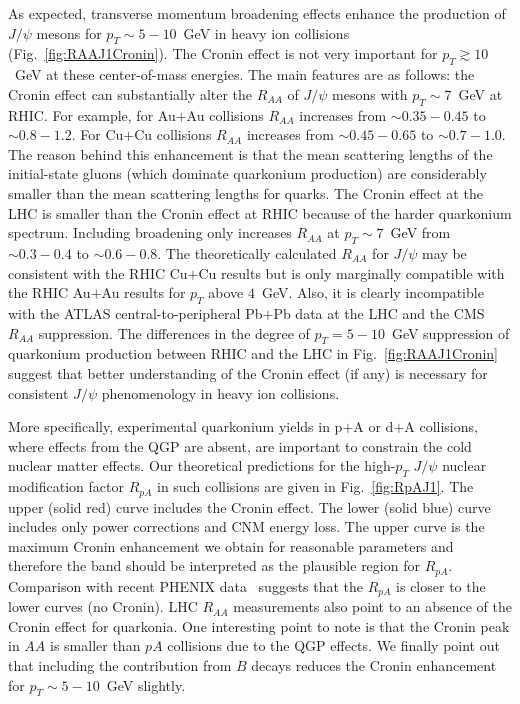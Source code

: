 \documentclass[article,showpacs,preprintnumbers,amsmath,amssymb]{revtex4}
\begin{document}
As expected, transverse momentum broadening effects enhance the production of
$J/\psi$ mesons for $p_T \sim 5-10$~GeV in heavy ion collisions
(Fig.~\ref{fig:RAAJ1Cronin}).  The Cronin effect is not very important for
$p_T\gtrsim10$~GeV at these center-of-mass energies. The  main features are as
follows: the Cronin effect can substantially alter the $R_{AA}$  of $J/\psi$
mesons with $p_T\sim 7$~GeV  at RHIC.   For example, for Au$+$Au collisions
$R_{AA}$ increases from $\sim 0.35-0.45$ to $\sim0.8-1.2$. For Cu$+$Cu
collisions $R_{AA}$ increases from $\sim0.45-0.65$ to $\sim0.7-1.0$. The reason
behind this enhancement is that the mean scattering lengths of the
initial-state gluons (which dominate quarkonium production) are considerably
smaller than the mean scattering lengths for quarks.  The Cronin effect at the
LHC is smaller than the  Cronin effect at RHIC because of the harder quarkonium
spectrum. Including broadening only increases $R_{AA}$ at $p_T\sim 7$~GeV from
$\sim0.3-0.4$ to $\sim0.6-0.8$.  The theoretically calculated $R_{AA}$  for
$J/\psi$ may be consistent with the RHIC Cu$+$Cu results but is only marginally
compatible with the RHIC Au$+$Au results for $p_T$ above $4$~GeV.  Also, it is clearly incompatible
with the ATLAS central-to-peripheral  Pb$+$Pb data at the LHC and the
CMS $R_{AA}$ suppression. The differences in the degree of $p_T = 5 -10$~GeV
suppression of quarkonium production between RHIC and the LHC in
Fig.~\ref{fig:RAAJ1Cronin}  suggest  that better understanding of the Cronin
effect (if any) is necessary for  consistent $J/\psi$ phenomenology in heavy
ion collisions. 


More specifically,  experimental quarkonium yields in  p$+$A or d$+$A
collisions, where  effects from the QGP are absent, are important to constrain
the cold nuclear matter effects.  Our theoretical predictions for the
high-$p_T$  $J/\psi$ nuclear modification factor  $R_{pA}$ in such collisions
are given in Fig.~\ref{fig:RpAJ1}. The upper (solid red) curve includes the
Cronin effect. The lower (solid blue) curve includes only power corrections and
CNM energy loss.  The upper curve is the maximum Cronin enhancement we obtain
for reasonable parameters and therefore the band should be interpreted as the
plausible region for $R_{pA}$. Comparison with recent PHENIX
data~\cite{Adare:2012qf} suggests that the $R_{pA}$ is closer to the
lower curves (no Cronin). LHC $R_{AA}$ measurements also point to an absence of
the Cronin effect for quarkonia. One interesting point to note is that the
Cronin peak in $AA$ is smaller than $pA$ collisions due to the QGP effects. We
finally point out that including the contribution from $B$ decays reduces the
Cronin enhancement for $p_T \sim 5-10$~GeV slightly. 
\end{document}
